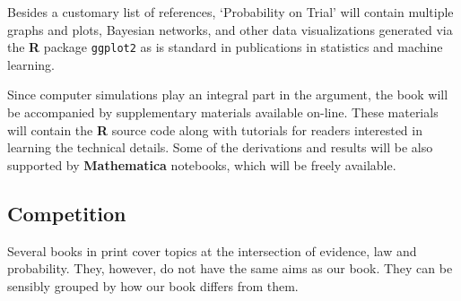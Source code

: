 \documentclass[
  10pt,
  dvipsnames,enabledeprecatedfontcommands]{scrartcl}
\begin{document}
\vspace{-2mm}

Besides a customary list of references, `Probability on Trial' will
contain multiple graphs and plots, Bayesian networks, and other data
visualizations generated via the \textbf{\textsf{R}} package
\texttt{ggplot2} as is standard in publications in statistics and
machine learning.

Since computer simulations play an integral part in the argument, the
book will be accompanied by supplementary materials available on-line.
These materials will contain the \textbf{\textsf{R}} source code along
with tutorials for readers interested in learning the technical details.
Some of the derivations and results will be also supported by
\textbf{\textsf{Mathematica}} notebooks, which will be freely available.

\hypertarget{competition}{%
\subsection{Competition}\label{competition}}

\normalsize

Several books in print cover topics at the intersection of evidence, law
and probability. They, however, do not have the same aims as our book.
They can be sensibly grouped by how our book differs from them.
\end{document}
